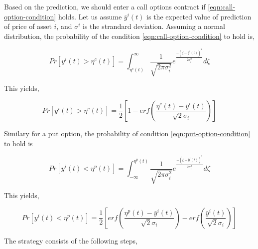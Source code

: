 \documentclass{article}
\begin{document}
Based on the prediction, we should enter a call options contract if
\ref{eqn:call-option-condition} holds. Let us assume $\bar{y}^{i}(t)$
is the expected value of prediction of price of asset $i$, and
$\sigma^{i}$ is the strandard deviation. Assuming a normal
distribution, the probability of the condition
\ref{eqn:call-option-condition} to hold is,

\begin{equation}\label{eqn:call-option-prob-intg}
Pr[ y^{i}(t) > \eta^{c}(t) ] = \int_{\eta^{c}(t)}^{\infty}
\frac{1}{\sqrt{2\pi\sigma_{i}^{2}}}
e^{\frac{-(\zeta-\bar{y}^{i}(t))^{2}}{2\sigma_{i}^{2}}} d\zeta
\end{equation}

This yields,

\begin{equation}\label{eqn:call-option-prob}
Pr[ y^{i}(t) > \eta^{c}(t) ] = \frac{1}{2} [ 1 - erf(
  \frac{\eta^{c}(t)-\bar{y}^{i}(t)}{\sqrt{2} \sigma_{i}} ) ]
\end{equation}

Similary for a put option, the probability of
condition \ref{eqn:put-option-condition} to hold is

\begin{equation}\label{eqn:put-option-prob-intg}
Pr[ y^{i}(t) < \eta^{p}(t) ] =
\int_{-\infty}^{\eta^{p}(t)} \frac{1}{\sqrt{2\pi\sigma_{i}^{2}}}
e^{\frac{-(\zeta-\bar{y}^{i}(t))^{2}}{2\sigma_{i}^{2}}} d\zeta
\end{equation}

This yields,

\begin{equation}\label{eqn:put-option-prob}
Pr[ y^{i}(t) < \eta^{p}(t) ] = \frac{1}{2} [ erf(
  \frac{\eta^{p}(t)-\bar{y}^{i}(t)}{\sqrt{2} \sigma_{i}} ) -
  erf( \frac{\bar{y}^{i}(t)}{\sqrt{2} \sigma_{i}} ) ]
\end{equation}

The strategy consists of the following steps,
\end{document}
